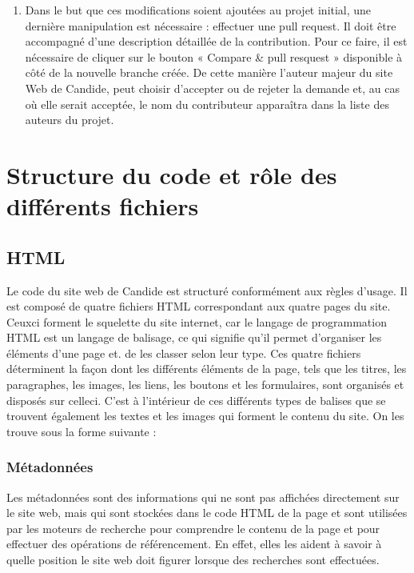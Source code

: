 \documentclass[a4,10pt,french]{sphinxmanual}
\begin{document}
\begin{enumerate}
\item {} 
\sphinxAtStartPar
Dans le but que ces modifications soient ajoutées au projet initial, une dernière manipulation est nécessaire : effectuer une pull request. Il doit être accompagné d’une description détaillée de la contribution. Pour ce faire, il est nécessaire de cliquer sur le bouton « Compare \& pull resquest » disponible à côté de la nouvelle branche créée. De cette manière l’auteur majeur du site Web de Candide, peut choisir d’accepter ou de rejeter la demande et, au cas où elle serait acceptée, le nom du contributeur apparaîtra dans la liste des auteurs du projet.

\end{enumerate}


\section{Structure du code et rôle des différents fichiers}
\label{\detokenize{chapitre-02:structure-du-code-et-role-des-differents-fichiers}}

\subsection{HTML}
\label{\detokenize{chapitre-02:html}}
\sphinxAtStartPar
Le code du site web de Candide est structuré conformément aux règles d’usage. Il est composé de quatre fichiers HTML correspondant aux quatre pages du site. Ceux\sphinxhyphen{}ci forment le squelette du site internet, car le langage de programmation HTML est un langage de balisage, ce qui signifie qu’il permet d’organiser les éléments d’une page et. de les classer selon leur type. Ces quatre fichiers déterminent la façon dont les différents éléments de la page, tels que les titres, les paragraphes, les images, les liens, les boutons et les formulaires, sont organisés et disposés sur celle\sphinxhyphen{}ci. C’est à l’intérieur de ces différents types de balises que se trouvent également les textes et les images qui forment le contenu du site. On les trouve sous la forme suivante : 


\subsubsection{Métadonnées}
\label{\detokenize{chapitre-02:metadonnees}}
\sphinxAtStartPar
Les métadonnées sont des informations qui ne sont pas affichées directement sur le site web, mais qui sont stockées dans le code HTML de la page et sont utilisées par les moteurs de recherche pour comprendre le contenu de la page et pour effectuer des opérations de référencement. En effet, elles les aident à savoir à quelle position le site web doit figurer lorsque des recherches sont effectuées.
\end{document}
